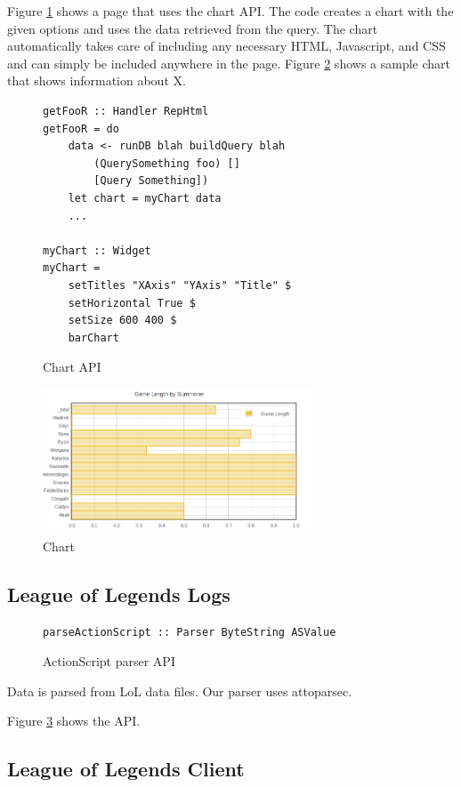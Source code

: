 \documentclass{chi2009}
\begin{document}
Figure \ref{chartcode} shows a page that uses the chart API. The code creates a chart with the given options and uses the data retrieved from the query. The chart automatically takes care of including any necessary HTML, Javascript, and CSS and can simply be included anywhere in the page. Figure \ref{chart} shows a sample chart that shows information about X.

\begin{figure}[]
\begin{verbatim}
getFooR :: Handler RepHtml
getFooR = do
    data <- runDB blah buildQuery blah
        (QuerySomething foo) []
        [Query Something])
    let chart = myChart data
    ...

myChart :: Widget
myChart = 
    setTitles "XAxis" "YAxis" "Title" $
    setHorizontal True $
    setSize 600 400 $
    barChart
\end{verbatim}
    \caption{Chart API}
    \label{chartcode}
\end{figure}

\begin{figure}[h]
    \includegraphics[width=80mm]{imgs/chart.png}
    \caption{Chart}
    \label{chart}
\end{figure}

\subsection{League of Legends Logs}

\begin{figure}[]
\begin{verbatim}
parseActionScript :: Parser ByteString ASValue
\end{verbatim}
    \caption{ActionScript parser API}
    \label{asapi}
\end{figure}

Data is parsed from LoL data files. Our parser uses attoparsec.

Figure \ref{asapi} shows the API.

\subsection{League of Legends Client}
\end{document}
